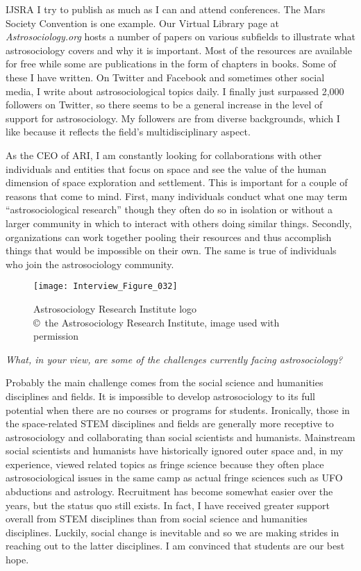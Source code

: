 \begin{labeling}{IJSRA}
	I try to publish as much as I can and attend conferences. The Mars Society Convention is one example. Our Virtual Library page at \emph{Astrosociology.org} hosts a number of papers on various subfields to illustrate what astrosociology covers and why it is important. Most of the resources are available for free while some are publications in the form of chapters in books. Some of these I have written. On Twitter and Facebook and sometimes other social media, I write about astrosociological topics daily. I finally just surpassed 2,000 followers on Twitter, so there seems to be a general increase in the level of support for astrosociology. My followers are from diverse backgrounds, which I like because it reflects the field’s multidisciplinary aspect.

	As the CEO of ARI, I am constantly looking for collaborations with other individuals and entities that focus on space and see the value of the human dimension of space exploration and settlement. This is important for a couple of reasons that come to mind. First, many individuals conduct what one may term “astrosociological research” though they often do so in isolation or without a larger community in which to interact with others doing similar things. Secondly, organizations can work together pooling their resources and thus accomplish things that would be impossible on their own. The same is true of individuals who join the astrosociology community.

	\begin{figure}[!tb]
		\texttt{[image: Interview\_Figure\_032]}
		\centering
		\caption{Astrosociology Research Institute logo
			{\normalfont\scriptsize \\ \copyright\ the Astrosociology Research Institute, image used with permission
		}}
		\label{Interview_Figure_032}
	\end{figure}

	\item[IJSRA] \emph{What, in your view, are some of the challenges currently facing astrosociology?}

	\item[JP] Probably the main challenge comes from the social science and humanities disciplines and fields. It is impossible to develop astrosociology to its full potential when there are no courses or programs for students. Ironically, those in the space-related STEM disciplines and fields are generally more receptive to astrosociology and collaborating than social scientists and humanists. Mainstream social scientists and humanists have historically ignored outer space and, in my experience, viewed related topics as fringe science because they often place astrosociological issues in the same camp as actual fringe sciences such as UFO abductions and astrology. Recruitment has become somewhat easier over the years, but the status quo still exists. In fact, I have received greater support overall from STEM disciplines than from social science and humanities disciplines. Luckily, social change is inevitable and so we are making strides in reaching out to the latter disciplines. I am convinced that students are our best hope.


\end{labeling}
